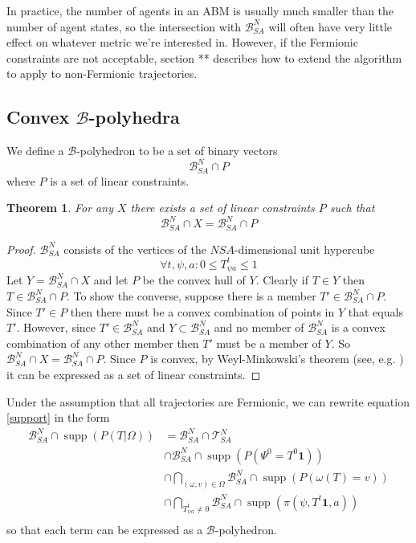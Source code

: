 \documentclass{article}
\newtheorem{theorem}{Theorem}
\DeclareMathOperator\supp{supp}
\begin{document}
In practice, the number of agents in an ABM is usually much smaller than the number of agent states, so the intersection with $\mathcal{B}^N_{SA}$ will often have very little effect on whatever metric we're interested in. However, if the Fermionic constraints are not acceptable, section ** describes how to extend the algorithm to apply to non-Fermionic trajectories.

\subsection{Convex $\mathcal{B}$-polyhedra}

We define a $\mathcal{B}$-polyhedron to be a set of binary vectors
\[
\mathcal{B}^N_{SA} \cap P
\]
where $P$ is a set of linear constraints.

\begin{theorem}
For any $X$ there exists a set of linear constraints $P$ such that
\[
\mathcal{B}^N_{SA} \cap X = \mathcal{B}^N_{SA} \cap P
\]
\end{theorem}
\begin{proof}
$\mathcal{B}^N_{SA}$ consists of the vertices of the $NSA$-dimensional unit hypercube
\begin{equation}
\forall t,\psi,a: 0 \le T^t_{\psi a} \le 1
\label{linearfermionic}
\end{equation}
Let $Y = \mathcal{B}^N_{SA} \cap X$ and let $P$ be the convex hull of $Y$. Clearly if $T\in Y$ then $T\in \mathcal{B}^N_{SA} \cap P$. To show the converse, suppose there is a member $T' \in \mathcal{B}^N_{SA} \cap P$. Since $T'\in P$ then there must be a convex combination of points in $Y$ that equals $T'$. However, since $T' \in \mathcal{B}^N_{SA}$ and $Y\subset \mathcal{B}^N_{SA}$ and no member of $\mathcal{B}^N_{SA}$ is a convex combination of any other member then $T'$ must be a member of $Y$. So $\mathcal{B}^N_{SA} \cap X = \mathcal{B}^N_{SA} \cap P$. Since $P$ is convex, by Weyl-Minkowski's theorem (see, e.g. \cite{fukuda2020polyhedral}) it can be expressed as a set of linear constraints.
\end{proof}

Under the assumption that all trajectories are Fermionic, we can rewrite equation \ref{support} in the form
\begin{equation}
\begin{aligned}
\mathcal{B}^N_{SA} \cap \supp (P( T |\Omega)) &= \mathcal{B}^N_{SA} \cap \mathcal{T}^N_{SA}\\
&\cap \mathcal{B}^N_{SA} \cap  \supp(P(\Psi^0 = T^0\mathbf{1}))\\
&\cap \bigcap_{(\omega,v) \in \Omega}   \mathcal{B}^N_{SA} \cap \supp\left(P\left(\omega(T)=v\right)\right)\\
&\cap \bigcap_{T^t_{\psi a} \ne 0}  \mathcal{B}^N_{SA} \cap \supp\left(\pi(\psi,T^t\mathbf{1},a)\right)\\
\end{aligned}
\label{fermionicSupport}
\end{equation}
so that each term can be expressed as a $\mathcal{B}$-polyhedron.
\end{document}

